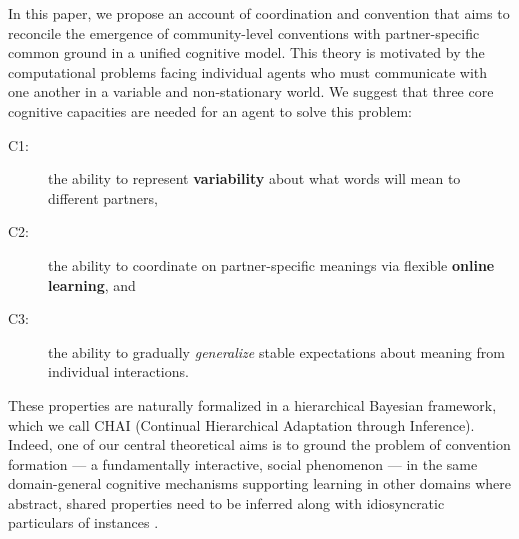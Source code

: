 In this paper, we propose an account of coordination and convention that aims to reconcile the emergence of community-level conventions with partner-specific common ground in a unified cognitive model.
This theory is motivated by the computational problems facing individual agents who must communicate with one another in a variable and non-stationary world. 
We suggest that three core cognitive capacities are needed for an agent to solve this problem:
\begin{description}
\item[C1:] the ability to represent \textbf{variability} about what words will mean to different partners,
\item[C2:] the ability to coordinate on partner-specific meanings via flexible \textbf{online learning}, and
\item[C3:] the ability to gradually \emph{generalize} stable expectations about meaning from individual interactions.
\end{description}
These properties are naturally formalized in a hierarchical Bayesian framework, which we call CHAI (Continual Hierarchical Adaptation through Inference). 
Indeed, one of our central theoretical aims is to ground the problem of convention formation --- a fundamentally interactive, social phenomenon --- in the same domain-general cognitive mechanisms supporting learning in other domains where abstract, shared properties need to be inferred along with idiosyncratic particulars of instances \cite{berniker2008estimating,GoodmanUllmanTenenbaum11_TheoryOfCausality,tenenbaum_how_2011,kleinschmidt2015robust}.

